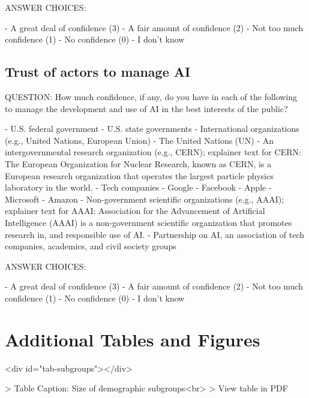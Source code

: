 \documentclass{article}
\begin{document}
\noindent ANSWER CHOICES:

-  A great deal of confidence (3)
-  A fair amount of confidence (2)
-  Not too much confidence (1)
-  No confidence (0)
-  I don’t know

\subsection{Trust of actors to manage AI}

\noindent QUESTION: How much confidence, if any, do you have in each of the following to manage the development and use of AI in the best interests of the public?


-  U.S. federal government
-  U.S. state governments
-  International organizations (e.g., United Nations, European Union)
-  The United Nations (UN)
-  An intergovernmental research organization (e.g., CERN); explainer text for CERN: The European Organization for Nuclear Research, known as CERN, is a European research organization that operates the largest particle physics laboratory in the world.
-  Tech companies
-  Google
-  Facebook
-  Apple
-  Microsoft
-  Amazon
-  Non-government scientific organizations (e.g., AAAI); explainer text for AAAI: Association for the Advancement of Artificial Intelligence (AAAI) is a non-government scientific organization that promotes research in, and responsible use of AI.
- Partnership on AI, an association of tech companies, academics, and civil society groups

\noindent ANSWER CHOICES:

-  A great deal of confidence (3)
-  A fair amount of confidence (2)
-  Not too much confidence (1)
-  No confidence (0)
-  I don’t know

\FloatBarrier

\section{Additional Tables and Figures}

\begin{table}<div id="tab-subgroups"></div>

> Table Caption: \label{tab:subgroups}Size of demographic subgroups<br>
> View table in PDF
\end{table}
\end{document}
